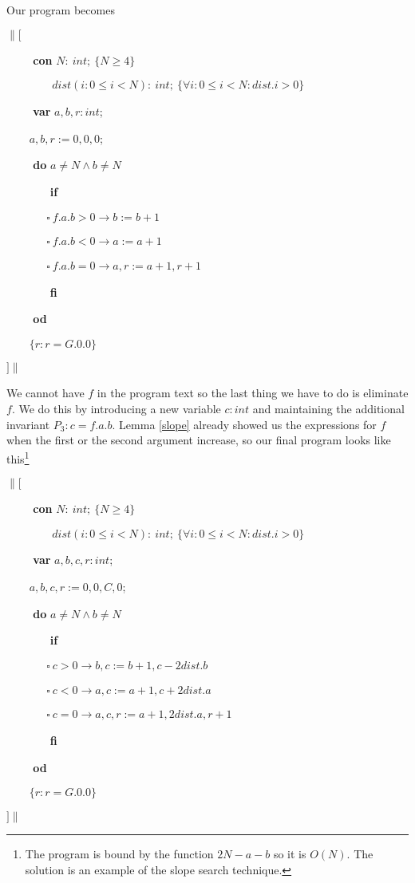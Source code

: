 Our program becomes\medskip

$\|[$

\verb|    | \textbf{con} $N:\ int;\ \{N \geq 4\}$

\verb|        | $dist(i: 0 \leq i < N):\ int;\ \{\forall i: 0 \leq i < N: dist.i > 0\}$

\verb|    | \textbf{var} $a, b, r: int$;

\verb|    | $a, b, r := 0, 0, 0$;

\verb|    | \textbf{do} $a \neq N \wedge b \neq N$

\verb|       | \textbf{if}

\verb|       | $\square\  f.a.b > 0 \rightarrow b := b + 1$

\verb|       |  $\square\  f.a.b < 0 \rightarrow a := a + 1$ 

\verb|       |  $\square\  f.a.b = 0 \rightarrow a, r := a + 1, r + 1$ 

\verb|       | \textbf{fi}

\verb|    | \textbf{od}

\verb|    | $\{r: r = G.0.0 \}$

$]\|$

\medskip

\noindent We cannot have $f$ in the program text so the last thing we have to do is eliminate $f$. We do this by introducing a new variable $c: int$ and maintaining the additional invariant $P_3: c = f.a.b$. Lemma \ref{slope} already showed us the expressions for $f$ when the first or the second argument increase, so our final program looks like this\footnote{The program is bound by the function $2 N - a - b$ so it is $O(N)$. The solution is an example of the slope search technique.}\medskip

$\|[$

\verb|    | \textbf{con} $N:\ int;\ \{N \geq 4\}$

\verb|        | $dist(i: 0 \leq i < N):\ int;\ \{\forall i: 0 \leq i < N: dist.i > 0\}$

\verb|    | \textbf{var} $a, b, c, r: int$;

\verb|    | $a, b, c, r := 0, 0, C, 0$;

\verb|    | \textbf{do} $a \neq N \wedge b \neq N$

\verb|       | \textbf{if}

\verb|       | $\square\  c > 0 \rightarrow b, c := b + 1, c - 2 dist.b$

\verb|       |  $\square\  c < 0 \rightarrow a, c := a + 1, c + 2 dist.a$ 

\verb|       |  $\square\  c = 0 \rightarrow a, c, r := a + 1, 2 dist.a, r + 1$ 

\verb|       | \textbf{fi}

\verb|    | \textbf{od}

\verb|    | $\{r: r = G.0.0 \}$

$]\|$






